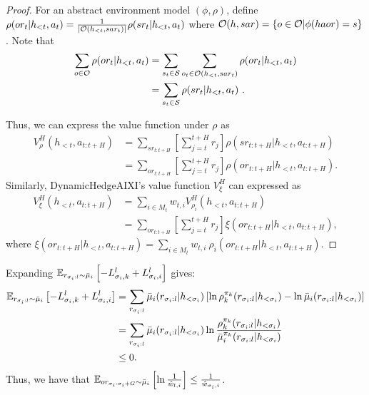     \begin{proof}
        For an abstract environment model $(\phi,\rho)$, define $\rho(or_t | h_{<t}, a_t) = \frac{1}{\lvert \mathcal{O}(h_{<t},sar_t) \rvert} \rho(sr_t | h_{<t}, a_t)$ where $\mathcal{O}(h,sar) = \left\{ o \in \mathcal{O} | \phi(haor) = s \right\}$. Note that
        \begin{align*}
            \sum_{o \in \mathcal{O}} \rho(or_t | h_{<t}, a_t) &= \sum_{s_t \in \mathcal{S}} \sum_{o_t \in \mathcal{O}(h_{<t}, sar_t)} \rho(or_t | h_{<t}, a_t) \\
            &= \sum_{s_t \in \mathcal{S}} \rho(sr_t | h_{<t}, a_t)~.
        \end{align*}
    
        Thus, we can express the value function under $\rho$ as
        \begin{align*}
            V_{\rho}^{H}(h_{<t}, a_{t:t+H}) &= \sum_{sr_{t:t+H}} \left[ \sum_{j=t}^{t+H} r_j \right] \rho(sr_{t:t+H} | h_{<t}, a_{t:t+H})\\
            &= \sum_{or_{t:t+H}} \left[ \sum_{j=t}^{t+H} r_j \right] \rho(or_{t:t+H} | h_{<t}, a_{t:t+H}).
        \end{align*}
        Similarly, DynamicHedgeAIXI's value function $V_{\xi}^{H}$ can expressed as
        \begin{align*}
            V_{\xi}^{H}(h_{<t}, a_{t:t+H}) 
            &= \sum_{i \in M_t} w_{t, i} V_{\rho_i}^{H}(h_{<t}, a_{t:t+H}) \\
            &= \sum_{or_{t:t+H}} \left[ \sum_{j=t}^{t+H} r_j \right] \xi(or_{t:t+H} | h_{<t}, a_{t:t+H}),
        \end{align*}
        where $\xi(or_{t:t+H} | h_{<t}, a_{t:t+H}) = \sum_{i \in M_t} w_{t, i} ~ \rho_i(or_{t:t+H} | h_{<t}, a_{t:t+H})$.
    \end{proof}

\fi





\iffalse







    \Line

    Expanding $\mathbb{E}_{r_{\sigma_i:l} \sim \bar{\mu}_i} \left[ - L_{\sigma_i, k}^{l} + L_{\sigma_i, i}^{l}\right]$ gives:
    \begin{align*}
        \mathbb{E}_{r_{\sigma_i:l} \sim \bar{\mu}_i} \left[ - L_{\sigma_i, k}^{l} + L_{\sigma_i, i}^{l}\right] &= \sum_{r_{\sigma_i:l}} \bar{\mu}_i(r_{\sigma_i:l} | h_{<\sigma_i}) \left[ \ln \rho_k^{\pi_k}(r_{\sigma_i:l} | h_{<\sigma_i}) - \ln \bar{\mu}_i(r_{\sigma_i:l} | h_{<\sigma_i}) \right]\\
        &= \sum_{r_{\sigma_i:l}} \bar{\mu}_i(r_{\sigma_i:l} | h_{<\sigma_i}) \ln \frac{\rho_k^{\pi_k}(r_{\sigma_i:l} | h_{<\sigma_i})}{\bar{\mu}_i^{\pi_k}(r_{\sigma_i:l} | h_{<\sigma_i})}\\
        &\leq 0.
    \end{align*}
    Thus, we have that $\mathbb{E}_{or_{\sigma_i:\sigma_{i}+G} \sim \bar{\mu}_i} \left[ \ln \frac{1}{\hat{w}_{l, i}} \right] \leq \frac{1}{\hat{w}_{\sigma_i, i}}$. 



